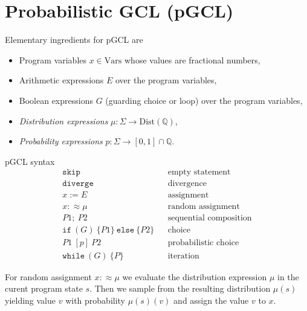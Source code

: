 \documentclass[english]{panikzettel}
\newcommand{\Dist}{\mathrm{Dist}}
\newcommand{\stmtSkip}{\texttt{skip}}
\newcommand{\stmtDiverge}{\texttt{diverge}}
\newcommand{\stmtAsgn}[2]{#1 := #2}
\newcommand{\stmtRasgn}[2]{#1 :\approx #2}
\newcommand{\stmtSeq}[2]{#1;~ #2}
\newcommand{\stmtIf}[3]{\texttt{if}~(#1)~\{ #2 \}~\texttt{else}~\{ #3 \}}
\newcommand{\stmtProb}[3]{#2 ~[#1]~ #3}
\newcommand{\stmtWhile}[2]{\texttt{while}~(#1)~\{ #2 \}}
\newcommand{\Vars}{\mathrm{Vars}}
\newcommand{\rat}{\mathbb{Q}}
\begin{document}
\section{Probabilistic GCL (pGCL)}

\begin{halfboxl}
	Elementary ingredients for pGCL are
	\begin{itemize}
		\item Program variables $x \in \Vars$ whose values are fractional numbers,
		\item Arithmetic expressions $E$ over the program variables,
		\item Boolean expressions $G$ (guarding choice or loop) over the program variables,
		\item \emph{Distribution expressions} $\mu : \Sigma \to \Dist(\rat)$,
		\item \emph{Probability expressions} $p : \Sigma \to [0,1] \cap \rat$.
	\end{itemize}
\end{halfboxl}%
\begin{halfboxr}
	\vspace{-\baselineskip}
	\begin{defi}{pGCL syntax}
		\footnotesize{}
		\vspace{-\baselineskip}
		\begin{align*}
			\stmtSkip            &  & \text{empty statement}        \\
			\stmtDiverge         &  & \text{divergence}             \\
			\stmtAsgn{x}{E}      &  & \text{assignment}             \\
			\stmtRasgn{x}{\mu}   &  & \text{random assignment}      \\
			\stmtSeq{P1}{P2}     &  & \text{sequential composition} \\
			\stmtIf{G}{P1}{P2}   &  & \text{choice}                 \\
			\stmtProb{p}{P1}{P2} &  & \text{probabilistic choice}   \\
			\stmtWhile{G}{P}     &  & \text{iteration}
		\end{align*}
	\end{defi}
\end{halfboxr}

For random assignment $\stmtRasgn{x}{\mu}$ we evaluate the distribution expression $\mu$ in the curent program state $s$.
Then we sample from the resulting distribution $\mu(s)$ yielding value $v$ with probability $\mu(s)(v)$ and assign the value $v$ to $x$.
\end{document}
